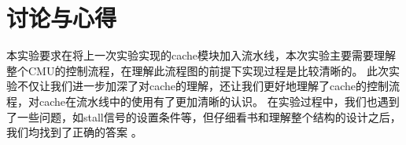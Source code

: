 \section{讨论与心得}
本实验要求在将上一次实验实现的cache模块加入流水线，本次实验主要需要理解整个CMU的控制流程，在理解此流程图的前提下实现过程是比较清晰的。
此次实验不仅让我们进一步加深了对cache的理解，还让我们更好地理解了cache的控制流程，对cache在流水线中的使用有了更加清晰的认识。
在实验过程中，我们也遇到了一些问题，如stall信号的设置条件等，但仔细看书和理解整个结构的设计之后，我们均找到了正确的答案 。
